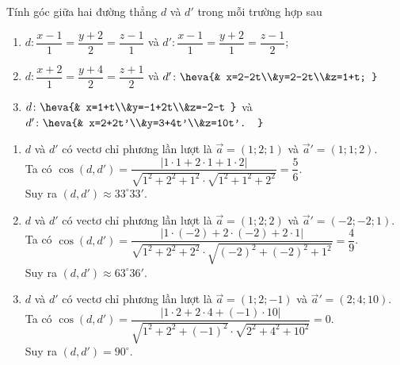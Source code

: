\begin{vd}%
	Tính góc giữa hai đường thẳng $d$ và $d'$ trong mỗi trường hợp sau
	\begin{enumerate}
		\item $d\colon\dfrac{x-1}{1}=\dfrac{y+2}{2}=\dfrac{z-1}{1}$ và $d'\colon\dfrac{x-1}{1}=\dfrac{y+2}{1}=\dfrac{z-1}{2}$;
		\item $d\colon\dfrac{x+2}{1}=\dfrac{y+4}{2}=\dfrac{z+1}{2}$ và $d'\colon\heva{& x=2-2t\\&y=2-2t\\&z=1+t; }$
		\item $d\colon\heva{& x=1+t\\&y=-1+2t\\&z=-2-t }$ và $d'\colon\heva{& x=2+2t'\\&y=3+4t'\\&z=10t'. }$
	\end{enumerate}
	\loigiai
	{
		\begin{enumerate}
			\item $d$ và $d'$ có vectơ chỉ phương lần lượt là $\overrightarrow{a}=(1;2;1)$ và $\overrightarrow{a}'=(1;1;2)$.\\
			Ta có $\cos (d,d')=\dfrac{\left |1\cdot 1+2\cdot 1+1\cdot 2 \right |}{\sqrt{1^2+2^2+1^2}\cdot\sqrt{1^2+1^2+2^2}}=\dfrac{5}{6}$.\\
			Suy ra $(d,d')\approx 33^{\circ}33'$.
			\item $d$ và $d'$ có vectơ chỉ phương lần lượt là $\overrightarrow{a}=(1;2;2)$ và $\overrightarrow{a}'=(-2;-2;1)$.\\
			Ta có $\cos (d,d')=\dfrac{\left |1\cdot (-2)+2\cdot (-2)+2\cdot 1 \right |}{\sqrt{1^2+2^2+2^2}\cdot\sqrt{(-2)^2+(-2)^2+1^2}}=\dfrac{4}{9}$.\\
			Suy ra $(d,d')\approx 63^{\circ}36'$.
			\item $d$ và $d'$ có vectơ chỉ phương lần lượt là $\overrightarrow{a}=(1;2;-1)$ và $\overrightarrow{a}'=(2;4;10)$.\\
			Ta có $\cos (d,d')=\dfrac{\left |1\cdot 2+2\cdot 4+(-1)\cdot 10 \right |}{\sqrt{1^2+2^2+(-1)^2}\cdot\sqrt{2^2+4^2+10^2}}=0$.\\
			Suy ra $(d,d')=90^{\circ}$.
		\end{enumerate}
	}
\end{vd}

